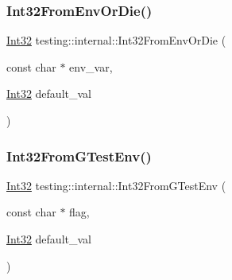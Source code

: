 \mbox{\label{namespacetesting_1_1internal_aaa576613655c2f380278c255c3ec5fef}} 
\subsubsection{\texorpdfstring{Int32\+From\+Env\+Or\+Die()}{Int32FromEnvOrDie()}}
{\footnotesize\ttfamily \hyperlink{namespacetesting_1_1internal_a8ee38faaf875f133358abaf9bc056cec}{Int32} testing\+::internal\+::\+Int32\+From\+Env\+Or\+Die (\begin{DoxyParamCaption}\item[{const char $\ast$}]{env\+\_\+var,  }\item[{\hyperlink{namespacetesting_1_1internal_a8ee38faaf875f133358abaf9bc056cec}{Int32}}]{default\+\_\+val }\end{DoxyParamCaption})}

\mbox{\label{namespacetesting_1_1internal_a0f7e728793f9e6cb0aa2b69eaa468bf3}} 
\subsubsection{\texorpdfstring{Int32\+From\+G\+Test\+Env()}{Int32FromGTestEnv()}}
{\footnotesize\ttfamily \hyperlink{namespacetesting_1_1internal_a8ee38faaf875f133358abaf9bc056cec}{Int32} testing\+::internal\+::\+Int32\+From\+G\+Test\+Env (\begin{DoxyParamCaption}\item[{const char $\ast$}]{flag,  }\item[{\hyperlink{namespacetesting_1_1internal_a8ee38faaf875f133358abaf9bc056cec}{Int32}}]{default\+\_\+val }\end{DoxyParamCaption})}

\mbox{\label{namespacetesting_1_1internal_a3316c24e8a79f5def3e85d763ae50854}} 
